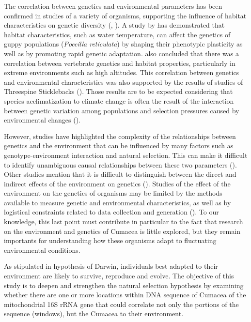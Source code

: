 The correlation between genetics and environmental parameters has been confirmed in studies of a variety of organisms, supporting the influence of habitat characteristics on genetic diversity (\citep{colosimo_widespread_2005}, \citep{cheviron_genomic_2012}). A study by \citep{ghalambor_adaptive_2007} has demonstrated that habitat characteristics, such as water temperature, can affect the genetics of guppy populations (\emph{Poecilla reticulata}) by shaping their phenotypic plasticity as well as by promoting rapid genetic adaptation. \citep{cheviron_genomic_2012} also concluded that there was a correlation between vertebrate genetics and habitat properties, particularly in extreme environments such as high altitudes. This correlation between genetics and environmental characteristics was also supported by the results of studies of Threespine Sticklebacks (\citep{colosimo_widespread_2005}). Those results are to be expected considering that species acclimatization to climate change is often the result of the interaction between genetic variation among populations and selection pressures caused by environmental changes (\citep{hoffmann_climate_2011}).

However, studies have highlighted the complexity of the relationships between genetics and the environment that can be influenced by many factors such as genotype-environment interaction and natural selection. This can make it difficult to identify unambiguous causal relationships between these two parameters (\citep{balkenhol_identifying_2009}). Other studies mention that it is difficult to distinguish between the direct and indirect effects of the environment on genetics (\citep{manel_perspectives_2010, balkenhol_landscape_2019}). Studies of the effect of the environment on the genetics of organisms may be limited by the methods available to measure genetic and environmental characteristics, as well as by logistical constraints related to data collection and generation (\citep{manel_perspectives_2010, shafer_widespread_2013}). To our knowledge, this last point must contribute in particular to the fact that research on the environment and genetics of Cumacea is little explored, but they remain importants for understanding how these organisms adapt to fluctuating environmental conditions. 

As stipulated in hypothesis of Darwin, individuals best adapted to their environment are likely to survive, reproduce and evolve. The objective of this study is to deepen and strengthen the natural selection hypothesis by examining whether there are one or more locations within DNA sequence of Cumacea of the mitochondrial 16S rRNA gene that could correlate not only the portions of the sequence (windows), but the Cumacea to their environment.

